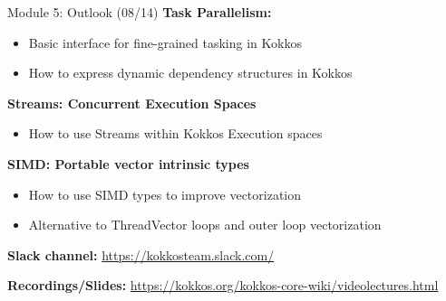 \begin{frame}{Module 5: Outlook (08/14)}
    \vspace{-3pt}
	\textbf{Task Parallelism:}
	\begin{itemize}
        \item {Basic interface for fine-grained tasking in Kokkos}
        \item {How to express dynamic dependency structures in Kokkos}
	\end{itemize}
	
	\vspace{5pt}
	\textbf{Streams: Concurrent Execution Spaces}
	\begin{itemize}
		\item {How to use Streams within Kokkos Execution spaces}
	\end{itemize}

	\vspace{5pt}
	\textbf{SIMD: Portable vector intrinsic types}
	\begin{itemize}
		\item {How to use SIMD types to improve vectorization}
		\item {Alternative to ThreadVector loops and outer loop vectorization}
	\end{itemize}

	\vspace{5pt}
    \textbf{Slack channel:} {\scriptsize \url{https://kokkosteam.slack.com/}}
	
	\vspace{5pt}
	\textbf{Recordings/Slides:} {\scriptsize \url{https://kokkos.org/kokkos-core-wiki/videolectures.html}}

\end{frame}



